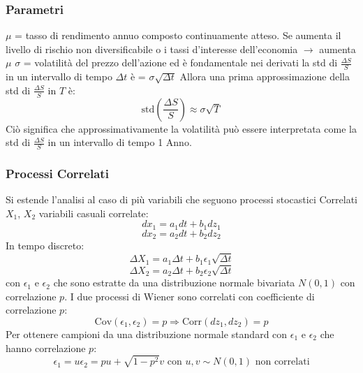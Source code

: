 \documentclass[12pt,a4paper]{report}
\begin{document}
\subsubsection{Parametri}
\(\mu\) = tasso di rendimento annuo composto continuamente atteso. Se aumenta il livello di rischio non diversificabile o i tassi d'interesse dell'economia \(\rightarrow\) aumenta \(\mu\)
\newline
\(\sigma\) = volatilità del prezzo dell'azione ed è fondamentale nei derivati
\newline
la std di \(\frac{\Delta S}{S}\) in un intervallo di tempo \(\Delta t\) è = \(\sigma \sqrt{\Delta t}\)
\newline
Allora una prima approssimazione della std di \(\frac{\Delta S}{S}\) in \(T\) è:
\[
\text{std} \left( \frac{\Delta S}{S} \right) \approx \sigma \sqrt{T}
\]
Ciò significa che approssimativamente la volatilità può essere interpretata come la std di \(\frac{\Delta S}{S}\) in un intervallo di tempo 1 Anno.
\subsubsection{Processi Correlati}
Si estende l'analisi al caso di più variabili che seguono processi stocastici Correlati
\newline
\(X_1\), \(X_2\) variabili casuali correlate:
\[
dx_1 = a_1 dt + b_1 dz_1
\]
\[
dx_2 = a_2 dt + b_2 dz_2
\]
In tempo discreto:
\[
\Delta X_1 = a_1 \Delta t + b_1 \epsilon_1 \sqrt{\Delta t}
\]
\[
\Delta X_2 = a_2 \Delta t + b_2 \epsilon_2 \sqrt{\Delta t}
\]
con \(\epsilon_1\) e \(\epsilon_2\) che sono estratte da una distribuzione normale bivariata \(N(0, 1)\) con correlazione \(p\).
I due processi di Wiener sono correlati con coefficiente di correlazione \(p\):
\[
\text{Cov}(\epsilon_1, \epsilon_2) = p \Longrightarrow \text{Corr}(dz_1, dz_2) = p
\]
Per ottenere campioni da una distribuzione normale standard con \(\epsilon_1\) e \(\epsilon_2\) che hanno correlazione \(p\):
\[
    \epsilon_1 = u
    \epsilon_2 = p u + \sqrt{1 - p^2} v
    \text{ con } u, v \sim N(0, 1) \text{ non correlati}
\]
\newpage
\end{document}
